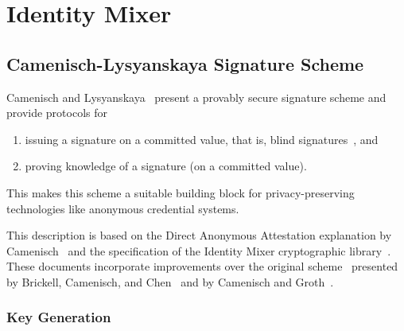 \chapter{Identity Mixer}

\section{Camenisch-Lysyanskaya Signature Scheme}

Camenisch and Lysyanskaya~\cite{CamenischLysyanskaya2002,Lysyanskaya2002}
present a provably secure signature scheme and provide protocols for
\begin{enumerate}
  \item issuing a signature on a committed value, that is, blind
    signatures~\cite{Chaum1983}, and
  \item proving knowledge of a signature (on a committed value).
\end{enumerate}
This makes this scheme a suitable building block for privacy-preserving
technologies like anonymous credential systems.

This description is based on the Direct Anonymous Attestation explanation by
Camenisch~\cite{Camenisch2007} and the specification of the Identity Mixer
cryptographic library~\cite{Idemix_Crypto2010}. These documents incorporate
improvements over the original scheme~\cite{CamenischLysyanskaya2002} presented
by Brickell, Camenisch, and Chen~\cite{BrickellCC2004} and by Camenisch and
Groth~\cite{CamenischGroth2004}.

\subsection{Key Generation}\label{sec:cl_keygen}

